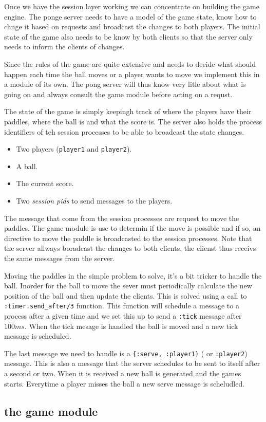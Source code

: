 \documentclass[a4paper,11pt]{article}
\begin{document}
Once we have the session layer working we can concentrate on building
the game engine. The ponge server needs to have a model of the game
state, know how to chnge it based on requests and broadcast the
changes to both players. The initial state of the game also needs to be
know by both clients so that the server only needs to inform the
clients of changes.

Since the rules of the game are quite extensive and needs to decide
what should happen each time the ball moves or a player wants to move
we implement this in a module of its own. The pong server will thus
know very litle about what is going on and always consult the game
module before acting on a requst. 

The state of the game is simply keepingh track of where the players
have their paddles, where the ball is and what the score is. The
server also holds the process identifiers of teh session processes to
be able to broadcast the state changes.


\begin{itemize}
\item Two players ({\tt player1} and {\tt player2}).
\item A ball.
\item The current score.
\item Two {\em session pids} to send messages to the players. 
\end{itemize}

The message that come from the session processes are request to move
the paddles. The game module is use to determin if the move is
possible and if so, an directive to move the paddle is broadcasted to
the session processes. Note that the server allways boradcast the
changes to both clients, the clienst thus receivs the same messages
from the server.

Moving the paddles in the simple problem to solve, it's a bit tricker
to handle the ball. Inorder for the ball to move the sever must
periodically calculate the new position of the ball and then update
the clients. This is solved using a call to {\tt :timer.send_after/3}
function. This function will schedule a message to a process after a
given time and we set this up to send a {\tt :tick} message after
$100 ms$. When the tick mesage is handled the ball is moved and a new
tick message is scheduled.

The last message we need to handle is a {\tt \{:serve, :player1\}} (
or {\tt :player2}) message. This is also a message that the server
schedules to be sent to itself after a second or two. When it is
received a new ball is generated and the games starts. Everytime a
player misses the ball a new serve message is scheludled.

\subsection*{the game module}
\end{document}

